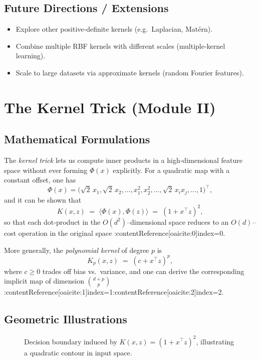 \documentclass[11pt]{article}
\begin{document}
\subsection{Future Directions / Extensions}
\begin{itemize}
  \item Explore other positive‐definite kernels (e.g.\ Laplacian, Matérn).  
  \item Combine multiple RBF kernels with different scales (multiple‐kernel learning).  
  \item Scale to large datasets via approximate kernels (random Fourier features).
\end{itemize}

\section{The Kernel Trick (Module II)}


\subsection{Mathematical Formulations}
The \emph{kernel trick} lets us compute inner products in a high‐dimensional feature space without ever forming $\Phi(x)$ explicitly.  For a quadratic map with a constant offset, one has
\[
\Phi(x) = \bigl(\sqrt{2}\,x_1,\sqrt{2}\,x_2,\dots,x_1^2,x_2^2,\dots,\sqrt{2}\,x_i x_j,\dots,1\bigr)^\top,
\]
and it can be shown that
\[
K(x,z) \;=\;\langle \Phi(x),\Phi(z)\rangle \;=\;(1 + x^\top z)^2,
\]
so that each dot‐product in the $O(d^2)$–dimensional space reduces to an $O(d)$–cost operation in the original space :contentReference[oaicite:0]{index=0}.

More generally, the \emph{polynomial kernel} of degree $p$ is
\[
K_p(x,z) \;=\;(c + x^\top z)^p,
\]
where $c\ge0$ trades off bias vs.\ variance, and one can derive the corresponding implicit map of dimension $\binom{d+p}{p}$ :contentReference[oaicite:1]{index=1}:contentReference[oaicite:2]{index=2}.

\subsection{Geometric Illustrations}
\begin{figure}[h]
  \centering
  \caption{Decision boundary induced by $K(x,z)=(1+x^\top z)^2$, illustrating a quadratic contour in input space.}
\end{figure}
\end{document}
